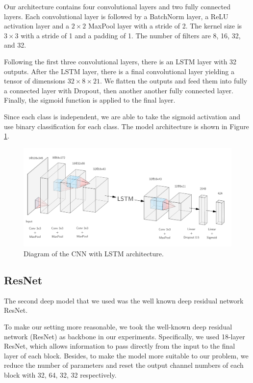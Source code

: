\documentclass{article}
\begin{document}
Our architecture contains four convolutional layers and two fully connected layers. Each convolutional layer is followed by a BatchNorm layer, a ReLU activation layer and a $2 \times 2$  MaxPool layer with a stride of 2. The kernel size is $3 \times 3$ with a stride of 1 and a padding of 1. The number of filters are 8, 16, 32, and 32.

Following the first three convolutional layers, there is an LSTM layer with 32 outputs. After the LSTM layer, there is a final convolutional layer yielding a tensor of dimensions $32\times 8 \times 21$. We flatten the outputs and feed them into fully a connected layer with Dropout, then another another fully connected layer. Finally, the sigmoid function is applied to the final layer. 

Since each class is independent, we are able to take the sigmoid activation and use binary classification for each class. The model architecture is shown in Figure \ref{cnn_lstm}.

\begin{figure}
\includegraphics[scale=0.45]{CNN_LSTM_diagram.png}
\caption{Diagram of the CNN with LSTM architecture. \label{cnn_lstm}}
\end{figure}


\subsection{ResNet}

The second deep model that we used was the well known deep residual network ResNet.

To make our setting more reasonable, we took the well-known deep residual network (ResNet) as backbone in our experiments. Specifically, we used 18-layer ResNet, which allows information to pass directly from the input to the final layer of each block. Besides, to make the model more suitable to our problem, we reduce the number of parameters and reset the output channel numbers of each block with 32, 64, 32, 32 respectively.
\end{document}
